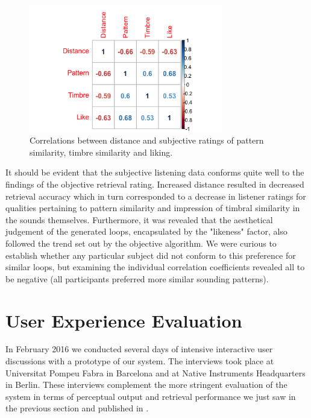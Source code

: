 \begin{figure}
	\begin{center}
		\includegraphics[width=0.75\textwidth]{ch07_evaluation/figures/correlation_matrix.png}
	\end{center}
	\caption[Correlations between distance and subjective ratings of pattern similarity, timbre similarity and liking]{Correlations between distance and subjective ratings of pattern similarity, timbre similarity and liking.}
	\label{fig:correlation_matrix}
\end{figure}

It should be evident that the subjective listening data conforms quite well to the findings of the objective retrieval rating. Increased distance resulted in decreased retrieval accuracy which in turn corresponded to a decrease in listener ratings for qualities pertaining to pattern similarity and impression of timbral similarity in the sounds themselves. Furthermore, it was revealed that the aesthetical judgement of the generated loops, encapsulated by the "likeness" factor, also followed the trend set out by the objective algorithm. We were curious to establish whether any particular subject did not conform to this preference for similar loops, but examining the individual correlation coefficients revealed all to be negative (all participants preferred more similar sounding patterns).

\section{User Experience Evaluation}

In February 2016 we conducted several days of intensive interactive user discussions with a prototype of our system. The interviews took place at Universitat Pompeu Fabra in Barcelona and at Native Instruments Headquarters in Berlin. These interviews complement the more stringent evaluation of the system in terms of perceptual output and retrieval performance  we just saw in the previous section and published in \cite{Nuanain2016b}.

